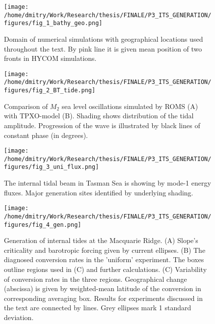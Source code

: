 \documentclass[12pt]{article}
\begin{document}
\begin{figure}
	\centering
	\texttt{[image: /home/dmitry/Work/Research/thesis/FINALE/P3\_ITS\_GENERATION/figures/fig\_1\_bathy\_geo.png]}
	\caption{Domain of numerical simulations with geographical locations used throughout the text. 
	By pink line it is given mean position of two fronts in HYCOM simulations.}
	\label{C3:fig:geo.map}
\end{figure}

\begin{figure}
	\centering
	\texttt{[image: /home/dmitry/Work/Research/thesis/FINALE/P3\_ITS\_GENERATION/figures/fig\_2\_BT\_tide.png]}
	\caption{Comparison of $M_2$ sea level oscillations simulated by ROMS (A) with 
	TPXO-model (B). Shading shows distribution of the tidal amplitude. Progression of the wave is 
	illustrated by black lines of constant phase (in degrees).}
	\label{C3.fig:BT}
\end{figure}

\begin{figure}
	\centering
	\texttt{[image: /home/dmitry/Work/Research/thesis/FINALE/P3\_ITS\_GENERATION/figures/fig\_3\_uni\_flux.png]}
	\caption{The internal tidal beam in Tasman Sea is showing by mode-1 energy fluxes. Major 
	generation sites identified by underlying shading.}
	\label{C3.fig:beam}
\end{figure}

\begin{figure}
	\centering
	\texttt{[image: /home/dmitry/Work/Research/thesis/FINALE/P3\_ITS\_GENERATION/figures/fig\_4\_gen.png]}
	\caption{Generation of internal tides at the Macquarie Ridge. (A) Slope's criticality and 
	barotropic forcing given by current ellipses. (B) The diagnosed conversion rates in the 
	'uniform' experiment. The boxes outline regions used in (C) and further calculations. (C) 
	Variability of conversion rates in the three regions. Geographical change (abscissa) is given 
	by weighted-mean latitude of the conversion in corresponding averaging box. Results for 
	experiments discussed in the text are connected by lines. Grey ellipses mark 1 standard 
	deviation.}
	\label{C3.fig:gen}
\end{figure}
\end{document}

